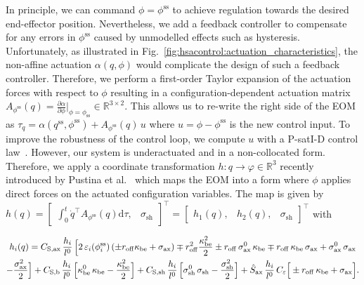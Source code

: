 In principle, we can command $\phi = \phi^\mathrm{ss}$ to achieve regulation towards the desired end-effector position.
Nevertheless, we add a feedback controller to compensate for any errors in $\phi^\mathrm{ss}$ caused by unmodelled effects such as hysteresis. Unfortunately, as illustrated in Fig.~\ref{fig:hsacontrol:actuation_characteristics}, the non-affine actuation $\alpha(q,\phi)$ would complicate the design of such a feedback controller.
Therefore, we perform a first-order Taylor expansion of the actuation forces with respect to $\phi$ resulting in a configuration-dependent actuation matrix $A_{\phi^\mathrm{ss}}(q) = \frac{\partial \alpha}{\partial \phi} \big|_{\phi = \phi_\mathrm{ss}} \in \mathbb{R}^{3 \times 2}$. This allows us to re-write the right side of the \gls{EOM} as $\tau_q = \alpha(q^\mathrm{ss}, \phi^\mathrm{ss}) + A_{\phi^\mathrm{ss}}(q) \, u$ where $u = \phi - \phi^\mathrm{ss}$ is the new control input.
To improve the robustness of the control loop, we compute $u$ with a P-satI-D control law~\citep{pustina2022p}. However, our system is underactuated and in a non-collocated form.
Therefore, we apply a coordinate transformation $h: q \rightarrow \varphi \in \mathbb{R}^3$ recently introduced by Pustina et al.~\citep{pustina2024input} which maps the \gls{EOM} into a form where $\phi$ applies direct forces on the actuated configuration variables. The map is given by { $h(q) = \begin{bmatrix}
    \int_0^t \dot{q}^\top A_{\phi^\mathrm{ss}}(q) \mathrm{d}\tau, & \sigma_\mathrm{sh}
\end{bmatrix}^\top = \begin{bmatrix}
    h_1(q), & h_2(q), & \sigma_\mathrm{sh}
\end{bmatrix}^\top$}
with
\begin{footnotesize}
\begin{multline}\footnotesize
    h_i(q) = 
    C_{\mathrm{S},\mathrm{ax}} \, \frac{h_i}{l^0} \, \Big [ 2 \, \varepsilon_i(\phi^\mathrm{ss}_i) \left ( \pm r_\mathrm{off} \kappa_\mathrm{be} + \sigma_\mathrm{ax} \right ) \mp r_\mathrm{off}^2 \frac{\kappa_\mathrm{be}^2}{2} \pm r_\mathrm{off} \, \sigma_\mathrm{ax}^0 \, \kappa_\mathrm{be} \mp r_\mathrm{off} \, \kappa_\mathrm{be} \, \sigma_\mathrm{ax} + \sigma_\mathrm{ax}^0 \, \sigma_\mathrm{ax}\\ - \frac{\sigma_\mathrm{ax}^2}{2} \Big ] 
    + C_{\mathrm{S},\mathrm{b}} \, \frac{h_i}{l^0} \, \Big [ \kappa_\mathrm{be}^0 \, \kappa_\mathrm{be} - \frac{\kappa_\mathrm{be}^2}{2} \Big ] 
    + C_{\mathrm{S},\mathrm{sh}} \, \frac{h_i}{l^0} \, \Big [\sigma_\mathrm{sh}^0 \, \sigma_\mathrm{sh} - \frac{\sigma_\mathrm{sh}^2}{2} \Big ]
    + \hat{S}_\mathrm{ax} \, \frac{h_i}{l^0} \, C_\varepsilon \Big [ \pm r_\mathrm{off} \, \kappa_\mathrm{be} + \sigma_\mathrm{ax} \Big ].
\end{multline}
\end{footnotesize}
